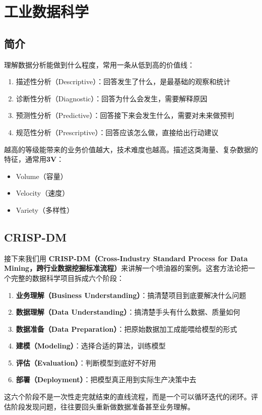 \section{工业数据科学}

\subsection{简介}

理解数据分析能做到什么程度，常用一条从低到高的价值线：
\begin{enumerate}
    \item 描述性分析（Descriptive）：回答发生了什么，是最基础的观察和统计
    \item 诊断性分析（Diagnostic）：回答为什么会发生，需要解释原因
    \item 预测性分析（Predictive）：回答接下来会发生什么，需要对未来做预判
    \item 规范性分析（Prescriptive）：回答应该怎么做，直接给出行动建议
\end{enumerate}
越高的等级能带来的业务价值越大，技术难度也越高。描述这类海量、复杂数据的特征，通常用\textbf{3V}：
\begin{itemize}
    \item Volume（容量）
    \item Velocity（速度）
    \item Variety（多样性）
\end{itemize}


\subsection{CRISP-DM}

接下来我们用 \textbf{CRISP-DM（Cross-Industry Standard Process for Data Mining，跨行业数据挖掘标准流程）}来讲解一个喷油器的案例。这套方法论把一个完整的数据科学项目拆成六个阶段：
\begin{enumerate}
    \item \textbf{业务理解（Business Understanding）}：搞清楚项目到底要解决什么问题
    \item \textbf{数据理解（Data Understanding）}：搞清楚手头有什么数据、质量如何
    \item \textbf{数据准备（Data Preparation）}：把原始数据加工成能喂给模型的形式
    \item \textbf{建模（Modeling）}：选择合适的算法，训练模型
    \item \textbf{评估（Evaluation）}：判断模型到底好不好用
    \item \textbf{部署（Deployment）}：把模型真正用到实际生产决策中去
\end{enumerate}
这六个阶段不是一次性走完就结束的直线流程，而是一个可以循环迭代的闭环。评估阶段发现问题，往往要回头重新做数据准备甚至业务理解。

